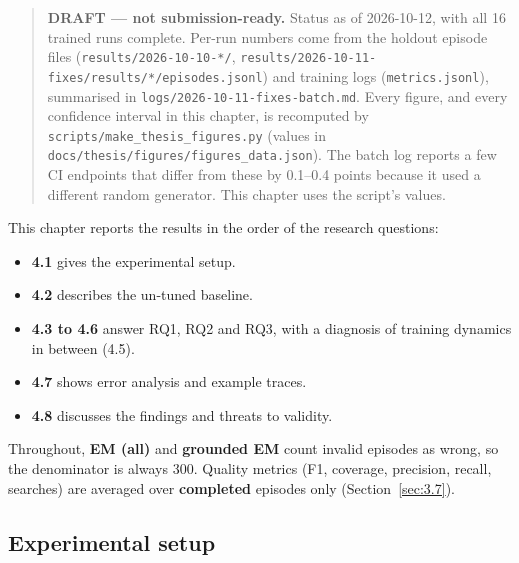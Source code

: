 
\begin{quote}
\textbf{DRAFT --- not submission-ready.} Status as of 2026-10-12, with
all 16 trained runs complete. Per-run numbers come from the holdout
episode files
(\texttt{results/\allowbreak{}2026-\allowbreak{}10-\allowbreak{}10-\allowbreak{}*/\allowbreak{}},
\texttt{results/\allowbreak{}2026-\allowbreak{}10-\allowbreak{}11-\allowbreak{}fixes/\allowbreak{}results/\allowbreak{}*/\allowbreak{}episodes.\allowbreak{}jsonl})
and training logs (\texttt{metrics.\allowbreak{}jsonl}), summarised in
\texttt{logs/\allowbreak{}2026-\allowbreak{}10-\allowbreak{}11-\allowbreak{}fixes-\allowbreak{}batch.\allowbreak{}md}.
Every figure, and every confidence interval in this chapter, is
recomputed by
\texttt{scripts/\allowbreak{}make\_\allowbreak{}thesis\_\allowbreak{}figures.\allowbreak{}py}
(values in
\texttt{docs/\allowbreak{}thesis/\allowbreak{}figures/\allowbreak{}figures\_\allowbreak{}data.\allowbreak{}json}).
The batch log reports a few CI endpoints that differ from these by
0.1--0.4 points because it used a different random generator. This
chapter uses the script's values.
\end{quote}

This chapter reports the results in the order of the research questions:

\begin{itemize}
\tightlist
\item
  \textbf{4.1} gives the experimental setup.
\item
  \textbf{4.2} describes the un-tuned baseline.
\item
  \textbf{4.3 to 4.6} answer RQ1, RQ2 and RQ3, with a diagnosis of
  training dynamics in between (4.5).
\item
  \textbf{4.7} shows error analysis and example traces.
\item
  \textbf{4.8} discusses the findings and threats to validity.
\end{itemize}

Throughout, \textbf{EM (all)} and \textbf{grounded EM} count invalid
episodes as wrong, so the denominator is always 300. Quality metrics
(F1, coverage, precision, recall, searches) are averaged over
\textbf{completed} episodes only (Section~\ref{sec:3.7}).

\subsection{Experimental setup}\label{sec:4.1}

